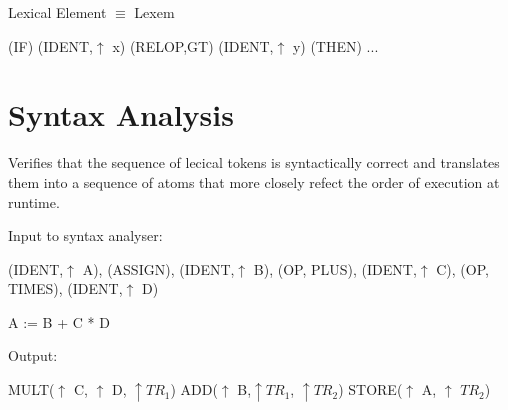 \documentclass[a4paper,12pt]{article}
\begin{document}
Lexical Element $\equiv$ Lexem


(IF) (IDENT,$\uparrow$ x) (RELOP,GT) (IDENT,$\uparrow$ y) (THEN) ...


\section{Syntax Analysis}

Verifies that the sequence of lecical tokens is syntactically correct
and translates them into a sequence of atoms that more closely refect
the order of execution at runtime.


Input to syntax analyser:


(IDENT,$\uparrow$ A), (ASSIGN), (IDENT,$\uparrow$ B), (OP, PLUS),
(IDENT,$\uparrow$ C), (OP, TIMES), (IDENT,$\uparrow$ D)

A := B + C * D


Output:


MULT($\uparrow$ C, $\uparrow$ D, $\uparrow TR_{1}$)
ADD($\uparrow$ B,$\uparrow TR_{1}$, $\uparrow TR_{2}$)
STORE($\uparrow$ A, $\uparrow$ $TR_{2}$)

\end{document}
